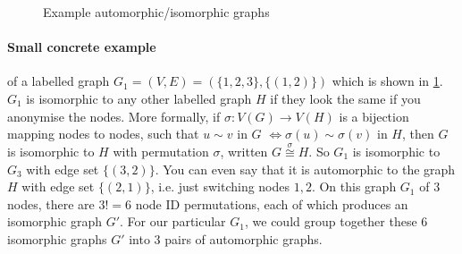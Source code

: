 \begin{figure}
    \caption{Example automorphic/isomorphic graphs}
    \label{fig:automorphic_isomorphic_graphs}
\end{figure}

\paragraph{Small concrete example} of a labelled graph $G_1 = (V, E) = (\{1, 2, 3\}, \{(1,2)\})$ which is shown in \cref{fig:automorphic_isomorphic_graphs}. $G_1$ is isomorphic to any other labelled graph $H$ if they look the same if you anonymise the nodes.
More formally, if $\sigma: V(G) \to V(H)$ is a bijection mapping nodes to nodes, such that $u \sim v$ in $G$ $\iff \sigma(u) \sim \sigma(v)$ in $H$, then $G$ is isomorphic to $H$ with permutation $\sigma$, written $G \stackrel{\sigma}{\cong} H$.
So $G_1$ is isomorphic to $G_3$ with edge set $\{(3,2)\}$. You can even say that it is automorphic to the graph $H$ with edge set $\{(2, 1)\}$, i.e. just switching nodes $1,2$.
On this graph $G_1$ of 3 nodes, there are $3! = 6$ node ID permutations, each of which produces an isomorphic graph $G'$. For our particular $G_1$, we could group together these 6 isomorphic graphs $G'$ into 3 pairs of automorphic graphs.

